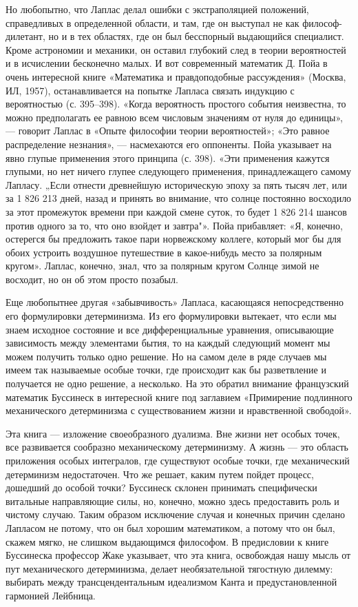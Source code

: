 Но любопытно, что Лаплас делал ошибки с экстраполяцией положений,
справедливых в определенной области, и там, где он выступал не как
философ-дилетант, но и в тех областях, где он был бесспорный выдающийся
специалист. Кроме астрономии и механики, он оставил глубокий след в теории
вероятностей и в исчислении бесконечно малых. И вот современный математик Д.
Пойа в очень интересной книге «Математика и правдоподобные рассуждения»
(Москва, ИЛ, 1957), останавливается на попытке Лапласа связать индукцию с
вероятностью (с. 395--398). «Когда вероятность простого события неизвестна, то
можно предполагать ее равною всем числовым значениям от нуля до единицы», ---
говорит Лаплас в «Опыте философии теории вероятностей»; «Это равное
распределение незнания», --- насмехаются его оппоненты. Пойа указывает на
явно глупые применения этого принципа (с. 398). «Эти применения кажутся
глупыми, но нет ничего глупее следующего применения, принадлежащего самому
Лапласу. „Если отнести древнейшую историческую эпоху за пять тысяч лет, или за
1 826 213 дней, назад и принять во внимание, что солнце постоянно восходило за
этот промежуток времени при каждой смене суток, то будет 1 826 214 шансов
против одного за то, что оно взойдет и завтра"». Пойа прибавляет: «Я,
конечно, остерегся бы предложить такое пари норвежскому коллеге, который мог
бы для обоих устроить воздушное путешествие в какое-нибудь место за
полярным кругом». Лаплас, конечно, знал, что за полярным кругом Солнце
зимой не восходит, но он об этом просто позабыл.

Еще любопытнее другая «забывчивость» Лапласа, касающаяся непосредственно его
формулировки детерминизма. Из его формулировки вытекает, что если мы знаем
исходное состояние и все дифференциальные уравнения, описывающие
зависимость между элементами бытия, то на каждый следующий момент мы можем
получить только одно решение. Но на самом деле в ряде случаев мы имеем так
называемые особые точки, где происходит как бы разветвление и получается не
одно решение, а несколько. На это обратил внимание французский математик
Буссинеск в интересной книге под заглавием «Примирение подлинного
механического детерминизма с существованием жизни и нравственной свободой».

Эта книга --- изложение своеобразного дуализма. Вне жизни нет особых точек, все
развивается сообразно механическому детерминизму. А жизнь --- это область
приложения особых интегралов, где существуют особые точки, где механический
детерминизм недостаточен. Что же решает, каким путем пойдет процесс,
дошедший до особой точки? Буссинеск склонен принимать специфически
витальные направляющие силы, но, конечно, можно здесь предоставить роль и
чистому случаю. Таким образом исключение случая и конечных причин сделано
Лапласом не потому, что он был хорошим математиком, а потому что он был,
скажем мягко, не слишком выдающимся философом. В предисловии к книге
Буссинеска профессор Жаке указывает, что эта книга, освобождая нашу мысль от
пут механического детерминизма, делает необязательной тягостную дилемму:
выбирать между трансцендентальным идеализмом Канта и предустановленной
гармонией Лейбница.

